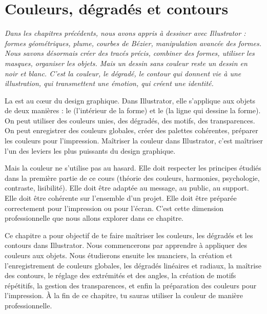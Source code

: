 
\chapter{Couleurs, dégradés et contours}

\noindent
\textit{Dans les chapitres précédents, nous avons appris à dessiner avec Illustrator : formes géométriques, plume, courbes de Bézier, manipulation avancée des formes. Nous savons désormais créer des tracés précis, combiner des formes, utiliser les masques, organiser les objets. Mais un dessin sans couleur reste un dessin en noir et blanc. C'est la couleur, le dégradé, le contour qui donnent vie à une illustration, qui transmettent une émotion, qui créent une identité.}

\vspace{1em}

\noindent
La  est au cœur du design graphique. Dans Illustrator, elle s'applique aux objets de deux manières : le  (l'intérieur de la forme) et le  (la ligne qui dessine la forme). On peut utiliser des couleurs unies, des dégradés, des motifs, des transparences. On peut enregistrer des couleurs globales, créer des palettes cohérentes, préparer les couleurs pour l'impression. Maîtriser la couleur dans Illustrator, c'est maîtriser l'un des leviers les plus puissants du design graphique.

\vspace{1em}

\noindent
Mais la couleur ne s'utilise pas au hasard. Elle doit respecter les principes étudiés dans la première partie de ce cours (théorie des couleurs, harmonies, psychologie, contraste, lisibilité). Elle doit être adaptée au message, au public, au support. Elle doit être cohérente sur l'ensemble d'un projet. Elle doit être préparée correctement pour l'impression ou pour l'écran. C'est cette dimension professionnelle que nous allons explorer dans ce chapitre.

\vspace{1em}

\noindent
Ce chapitre a pour objectif de te faire maîtriser les couleurs, les dégradés et les contours dans Illustrator. Nous commencerons par apprendre à appliquer des couleurs aux objets. Nous étudierons ensuite les nuanciers, la création et l'enregistrement de couleurs globales, les dégradés linéaires et radiaux, la maîtrise des contours, le réglage des extrémités et des angles, la création de motifs répétitifs, la gestion des transparences, et enfin la préparation des couleurs pour l'impression. À la fin de ce chapitre, tu sauras utiliser la couleur de manière professionnelle.

